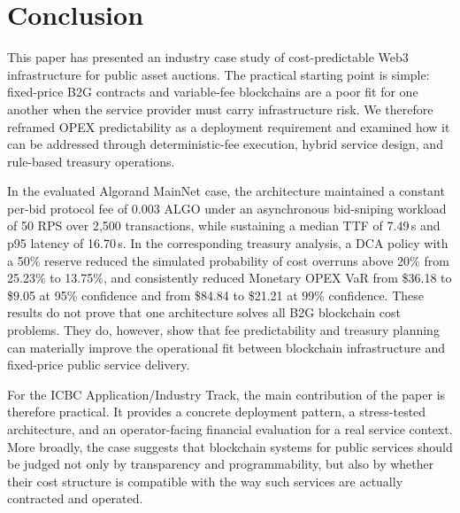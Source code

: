 \documentclass[runningheads]{llncs}
\begin{document}
\section{Conclusion}

This paper has presented an industry case study of cost-predictable Web3
infrastructure for public asset auctions. The practical starting point is simple:
fixed-price B2G contracts and variable-fee blockchains are a poor fit for one
another when the service provider must carry infrastructure risk. We therefore
reframed OPEX predictability as a deployment requirement and examined how it
can be addressed through deterministic-fee execution, hybrid service design, and
rule-based treasury operations.

In the evaluated Algorand MainNet case, the architecture maintained a constant per-bid
protocol fee of 0.003 ALGO under an asynchronous bid-sniping workload of 50 RPS over
2{,}500 transactions, while sustaining a median TTF of 7.49\,s and p95 latency of
16.70\,s. In the corresponding treasury analysis, a DCA policy with a 50\% reserve reduced
the simulated probability of cost overruns above 20\% from 25.23\% to 13.75\%,
and consistently reduced Monetary OPEX VaR from \$36.18 to \$9.05 at 95\% confidence
and from \$84.84 to \$21.21 at 99\% confidence. These results do not
prove that one architecture solves all B2G blockchain cost problems. They do,
however, show that fee predictability and treasury planning can materially improve
the operational fit between blockchain infrastructure and fixed-price public
service delivery.

For the ICBC Application/Industry Track, the main contribution of the paper is
therefore practical. It provides a concrete deployment pattern, a stress-tested
architecture, and an operator-facing financial evaluation for a real service
context. More broadly, the case suggests that blockchain systems for public
services should be judged not only by transparency and programmability, but
also by whether their cost structure is compatible with the way such services are
actually contracted and operated.


\end{document}
